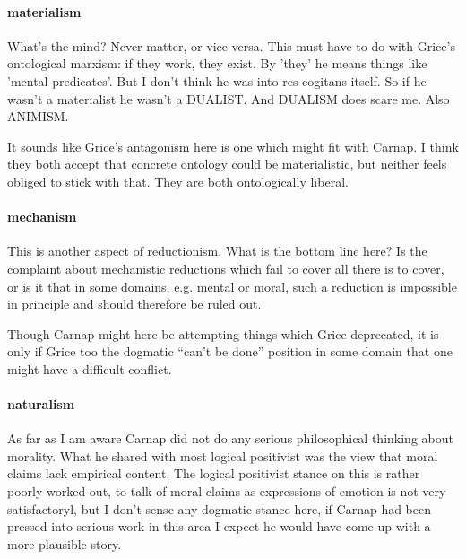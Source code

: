 \documentclass[10pt,titlepage]{book}
\newcommand{\ignore}[1]{}
\begin{document}
\paragraph{materialism}

What's the mind? Never matter, or vice versa. This must have  
to do with Grice's ontological marxism: if they work, they exist. By 'they' 
he  means things like 'mental predicates'. But I don't think he was into res 
 cogitans itself. So if he wasn't a materialist he wasn't a DUALIST. And 
DUALISM  does scare me. Also ANIMISM.

It sounds like Grice's antagonism here is one which might fit with Carnap.
I think they both accept that concrete ontology could be materialistic, but neither feels obliged to stick with that.
They are both ontologically liberal.
 
\paragraph{mechanism}

This is another aspect of reductionism.
What is the bottom line here?
Is the complaint about mechanistic reductions which fail to cover all there is to cover, or is it that in some domains, e.g. mental or moral, such a reduction is impossible in principle and should therefore be ruled out.

Though Carnap might here be attempting things which Grice deprecated, it is only if Grice too the dogmatic ``can't be done'' position in some domain that one might have a difficult conflict.
 
\paragraph{naturalism}

\ignore{
He does say that mean-N is the basis for mean-NN, so I think,  
or am pretty sure he means here a scheme that leaves VALUE out of the 
picture.  Especially concerned with the non-naturalistic basis of reason or 
rationality:  if rationality is a faculty OVER our pre-rational, natural, 
dispositions, it  cannot be "natural" herself. Etc.
} 

As far as I am aware Carnap did not do any serious philosophical thinking about morality.
What he shared with most logical positivist was the view that moral claims lack empirical content.
The logical positivist stance on this is rather poorly worked out, to talk of moral claims as expressions of emotion is not very satisfactoryl, but I don't sense any dogmatic stance here, if Carnap had been pressed into serious work in this area I expect he would have come up with a more plausible story.
\end{document}
